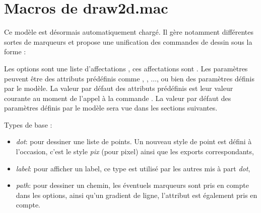 \section{Macros de draw2d.mac}\label{modeleDraw2d}

Ce modèle est désormais automatiquement chargé. Il gère notamment différentes sortes de marqueurs et propose une unification des commandes de dessin sous la forme :

{\centering {}\par}

Les options sont une liste d'affectations , ces affectations sont . Les
paramètres peuvent être des attributs prédéfinis comme , , $\ldots$, ou bien des paramètres définis par le modèle. La valeur par défaut des attributs prédéfinis est leur valeur courante au moment de l'appel à la commande . La valeur par défaut des paramètres définis par le modèle sera vue dans les sections suivantes.

Types de base :        
\begin{itemize}
 \item \emph{dot}: pour dessiner une liste de points. Un nouveau style de point est défini à l'occasion, c'est le style \emph{pix} (pour pixel) ainsi que les exports correspondants,
 \item \emph{label}: pour afficher un label, ce type est utilisé par les autres mis à part \emph{dot},
 \item \emph{path}: pour dessiner un chemin, les éventuels marqueurs sont pris en compte dans les options, ainsi qu'un gradient de ligne, l'attribut  est également pris en compte.
\end{itemize}

